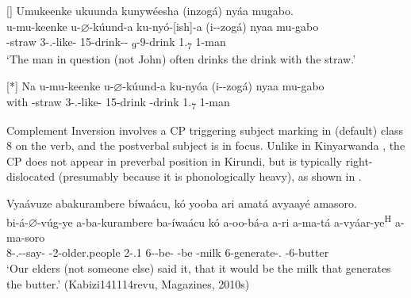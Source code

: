 \documentclass[output=paper]{langscibook}
\begin{document}
\ex
\begin{xlist}[SVOOOOO]
[]{
\label{ex:drinkstraw:c}
Umukeenke ukuunda kunywéesha (inzogá) nyáa mugabo.\\
\gll
u-mu-keenke  u-$\varnothing$-kúund-a  ku-nyó-[ish]-a (i-\N-{}zogá)   nyaa  mu-gabo \\
-{}straw  3\SM-\PRS.\CJ-{}like-\FV{}  15-{}drink-\CAUS-\FV{}   {\db}\AUG{}\textsubscript{9}-9-drink  1.\DEM{}\textsubscript{7}  1-man\\
\glt
  ‘The man in question (not John) often drinks the drink with the straw.’\\
}
\end{xlist}


\ex
\begin{xlist}[SVOOOOO]
[*]{
\label{ex:drinkstraw:d}
\gll
Na  u-mu-keenke  u-$\varnothing$-kúund-a  ku-nyóa   (i-\N-{}zogá)  nyaa  mu-gabo\\
  with  -{}straw  3\SM-\PRS.\CJ-{}like-\FV{}  {}15-{}drink  {\db}-{}drink  1.\DEM{}\textsubscript{7}  1-man\\
\glt
}
\end{xlist}

\z
\z

Complement Inversion involves a CP triggering subject marking in (default) class 8 on the verb, and the postverbal subject is in focus. Unlike in Kinyarwanda \citep[193]{Kimenyi1980}, the CP does not appear in preverbal position in Kirundi, but is typically right-dislocated (presumably because it is phonologically heavy), as shown in .

\ea
\label{bkm:Ref75348528}\citep[124]{Nshemezimana2016}
\ea
\begin{xlist}[SVOOOOO]
\label{bkm:Ref75348528:a}
Vyaávuze abakurambere bíwaácu, kó yooba ari amatá avyaayé amasoro.\\
\gll
bi-á-$\varnothing$-vúg-ye  a-ba-kurambere  ba-íwaácu  kó  a-oo-bá-a   a-ri  a-ma-tá  a-vyáar-ye\textsuperscript{H}  a-ma-soro \\
8\SM-\RMT.\PST-\CJ{}-say-\PFV{}  \AUG{}-2-{}older.people  2-\POSS.1\PL{}  \COMP{}  6\SM-\POT-{}be-\FV{}   \EXP-{}be  -{}milk  6\SM-{}generate-\PFV{}.\REL{}  \AUG{}-6-{}butter \\
\glt
  ‘Our elders (not someone else) said it, that it would be the milk that generates the butter.’ (Kabizi141114revu, Magazines, 2010s)\\
\end{xlist}
\end{document}
